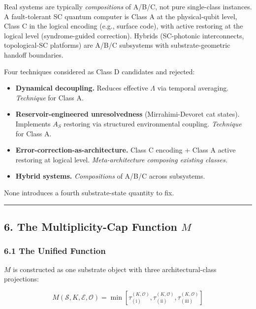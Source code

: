 \documentclass[
  11pt,
  a4paper,
]{article}
\providecommand{\tightlist}{%
  \setlength{\itemsep}{0pt}\setlength{\parskip}{0pt}}
\begin{document}
Real systems are typically \emph{compositions} of A/B/C, not pure
single-class instances. A fault-tolerant SC quantum computer is Class A
at the physical-qubit level, Class C in the logical encoding (e.g.,
surface code), with active restoring at the logical level
(syndrome-guided correction). Hybrids (SC-photonic interconnects,
topological-SC platforms) are A/B/C subsystems with substrate-geometric
handoff boundaries.

Four techniques considered as Class D candidates and rejected:

\begin{itemize}
\tightlist
\item
  \textbf{Dynamical decoupling.} Reduces effective \(\Lambda\) via
  temporal averaging. \emph{Technique} for Class A.
\item
  \textbf{Reservoir-engineered unresolvedness} (Mirrahimi-Devoret cat
  states). Implements \(A_{S}\) restoring via structured environmental
  coupling. \emph{Technique} for Class A.
\item
  \textbf{Error-correction-as-architecture.} Class C encoding + Class A
  active restoring at logical level. \emph{Meta-architecture composing
  existing classes.}
\item
  \textbf{Hybrid systems.} \emph{Compositions} of A/B/C across
  subsystems.
\end{itemize}

None introduces a fourth substrate-state quantity to fix.

\begin{center}\rule{0.5\linewidth}{0.5pt}\end{center}

\subsection{\texorpdfstring{6. The Multiplicity-Cap Function
\(M\)}{6. The Multiplicity-Cap Function M}}\label{the-multiplicity-cap-function-m}

\subsubsection{6.1 The Unified Function}\label{the-unified-function}

\(M\) is constructed as one substrate object with three
architectural-class projections:

\[
\boxed{\;M(\mathcal{S}, K, \mathcal{E}, \mathcal{O}) = \min\!\left[\tau_{(\mathrm{i})}^{(K, \mathcal{O})}, \tau_{(\mathrm{ii})}^{(K, \mathcal{O})}, \tau_{(\mathrm{iii})}^{(K, \mathcal{O})}\right]\;}
\]
\end{document}
